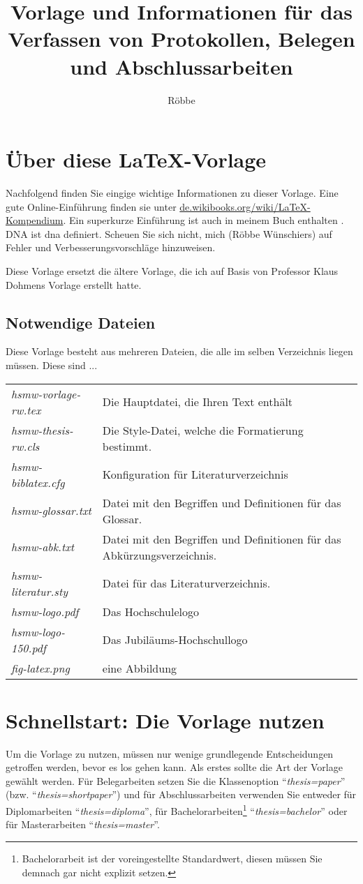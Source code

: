 \documentclass[
language=ngerman,	%
thesis=protokoll,		%
nomenclature,
%
	compactlistof,		%
%
	fancy,				%
%
%
	faculty=cb,			%
]{hsmw-vorlage-rw}
\title[Template and Information for Writing Protocols, Reports and Theses]{Vorlage und Informationen für das Verfassen von Protokollen, Belegen und Abschlussarbeiten}%
\author[Prof. Dr.]{Röbbe}{Wünschiers}<magic-juggler.png>
\begin{document}
    \chapter{Über diese \LaTeX{}-Vorlage}
    Nachfolgend finden Sie eingige wichtige Informationen zu dieser Vorlage. Eine gute Online-Einführung finden sie unter \url{de.wikibooks.org/wiki/LaTeX-Kompendium}. Ein superkurze Einführung ist auch in meinem Buch enthalten \citep{Wuenschiers2016kap12}. DNA ist \Gls{dna} definiert.
Scheuen Sie sich nicht, mich (Röbbe Wünschiers) auf Fehler und Verbesserungsvorschläge hinzuweisen.

Diese Vorlage ersetzt die ältere Vorlage, die ich auf Basis von Professor Klaus Dohmens Vorlage erstellt hatte.

\section{Notwendige Dateien}
Diese Vorlage besteht aus mehreren Dateien, die alle im selben Verzeichnis liegen müssen. Diese sind ...

\begin{tabular}{lp{}}
\textit{hsmw-vorlage-rw.tex} & Die Hauptdatei, die Ihren Text enthält \\
\textit{hsmw-thesis-rw.cls} & Die Style-Datei, welche die Formatierung bestimmt.\\
\textit{hsmw-biblatex.cfg} & Konfiguration für Literaturverzeichnis\\
\textit{hsmw-glossar.txt} & Datei mit den Begriffen und Definitionen für das Glossar.\\
\textit{hsmw-abk.txt} & Datei mit den Begriffen und Definitionen für das Abkürzungsverzeichnis.\\
\textit{hsmw-literatur.sty} & Datei für das Literaturverzeichnis.\\
\textit{hsmw-logo.pdf} & Das Hochschulelogo\\
\textit{hsmw-logo-150.pdf} & Das Jubiläums-Hochschullogo\\
\textit{fig-latex.png} & eine Abbildung\\
\end{tabular}
    
    \chapter{Schnellstart: Die Vorlage nutzen}
	
	Um die Vorlage zu nutzen, müssen nur wenige grundlegende Entscheidungen getroffen werden, bevor es los gehen kann.
	Als erstes sollte die Art der Vorlage gewählt werden.
	Für Belegarbeiten setzen Sie die Klassenoption \enquote{\textit{thesis=paper}} (bzw. \enquote{\textit{thesis=shortpaper}}) und für Abschlussarbeiten verwenden Sie entweder für Diplomarbeiten \enquote{\textit{thesis=diploma}}, für Bachelorarbeiten\footnote{Bachelorarbeit ist der voreingestellte Standardwert, diesen müssen Sie demnach gar nicht explizit setzen.} \enquote{\textit{thesis=bachelor}} oder für Masterarbeiten \enquote{\textit{thesis=master}}.
	
\end{document}

